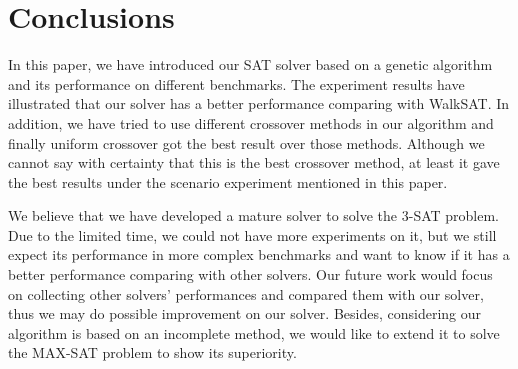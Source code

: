 \section{Conclusions}

In this paper, we have introduced our SAT solver based on a genetic algorithm and its performance on different benchmarks. The experiment results have illustrated that our solver has a better performance comparing with WalkSAT. In addition, we have tried to use different crossover methods in our algorithm and finally uniform crossover got the best result over those methods. Although we cannot say with certainty that this is the best crossover method, at least it gave the best results under the scenario experiment mentioned in this paper. 

We believe that we have developed a mature solver to solve the 3-SAT problem. Due to the limited time, we could not have more experiments on it, but we still expect its performance in more complex benchmarks and want to know if it has a better performance comparing with other solvers. Our future work would focus on collecting other solvers' performances and compared them with our solver, thus we may do possible improvement on our solver. Besides, considering our algorithm is based on an incomplete method, we would like to extend it to solve the MAX-SAT problem to show its superiority.
